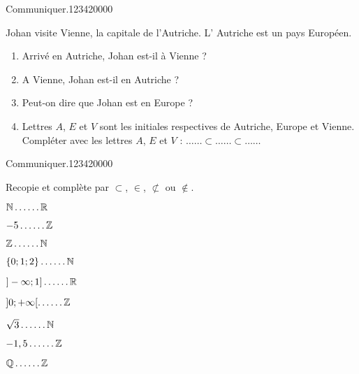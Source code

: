 \begin{pageParcoursu} %

\begin{ExoCu}{Communiquer.}{1234}{2}{0}{0}{0}{0}

Johan visite Vienne, la capitale de l'Autriche. L' Autriche est un pays Européen.
\begin{enumerate}[leftmargin=*]
\item Arrivé en Autriche, Johan est-il à Vienne ? 
\item A Vienne, Johan est-il en Autriche ?
\item Peut-on dire que Johan est en Europe ?
\item Lettres $A$, $E$ et $V$ sont les initiales respectives de Autriche, Europe et Vienne. Compléter avec les lettres $A$, $E$ et $V$ : $\ldots\ldots \subset \ldots\ldots \subset \ldots\ldots $
\end{enumerate}
\end{ExoCu}

\begin{ExoCu}{Communiquer.}{1234}{2}{0}{0}{0}{0}

Recopie et complète par $\subset$, $\in$, $\not\subset$ ou $\notin$.

\begin{enumerate}
\begin{minipage}{0.32\linewidth}
\item $\mathbb N \ldots \ldots \mathbb R$
\item $-5 \ldots \ldots \mathbb Z$
\item $\mathbb Z \ldots \ldots \mathbb N$
\end{minipage}
\hfill
\begin{minipage}{0.32\linewidth}
\item $\left\lbrace 0;1;2 \right\rbrace \ldots \ldots \mathbb N$
\item $]-\infty;1] \ldots \ldots \mathbb R$
\item $]0;+\infty[ \ldots \ldots \mathbb Z$
\end{minipage}
\hfill
\begin{minipage}{0.32\linewidth}
\item $\sqrt{3} \ldots \ldots \mathbb N$
\item $-1,5 \ldots \ldots \mathbb Z$
\item $\mathbb Q \ldots \ldots \mathbb Z$
\end{minipage}
\end{enumerate}
 

\end{ExoCu}
\end{pageParcoursu}

